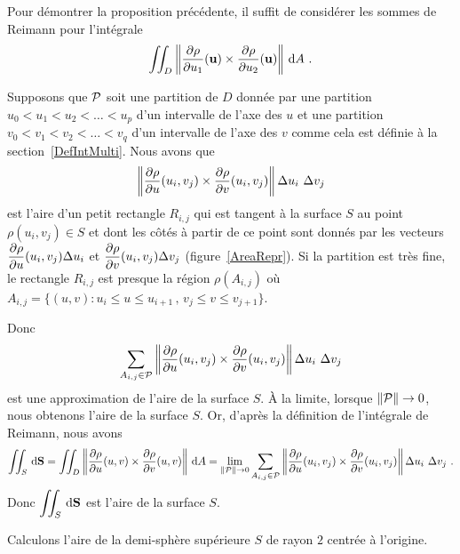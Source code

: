 {\begin{rmk}[\theory]
Pour démontrer la proposition précédente, il suffit de considérer les
sommes de Reimann pour l'intégrale
\[
\iint_D \left\|\frac{\partial \rho}{\partial u_1}(\mathbf{u}) \times
\frac{\partial \rho}{\partial u_2}(\mathbf{u})\right\| \,\mathrm{d}A \ .
\]

Supposons que $\cal P$ soit une partition de $D$ donnée par une partition
$u_0 < u_1 < u_2 < \ldots < u_p$ d'un intervalle de l'axe des $u$ et
une partition $v_0 < v_1 < v_2 < \ldots < v_{q}$ d'un intervalle de
l'axe des $v$ comme cela est définie à la section~\ref{DefIntMulti}.
Nous avons que
\[
\left\| \frac{\partial \rho}{\partial u}(u_i,v_j) \times \frac{\partial \rho}{\partial v}(u_i,v_j) \right\|
\Delta u_i \ \Delta v_j
\]
est l'aire d'un petit rectangle $R_{i,j}$ qui est tangent
à la surface $S$ au point $\rho(u_i,v_j) \in S$ et dont les côtés à
partir de ce point sont donnés par les vecteurs
$\displaystyle \frac{\partial \rho}{\partial u}(u_i,v_j) \Delta u_i$ et
$\displaystyle \frac{\partial \rho}{\partial v}(u_i,v_j) \Delta v_j$
(figure~\ref{AreaRepr}).  Si
la partition est très fine, le rectangle $R_{i,j}$ est presque la région
$\rho(A_{i,j})$ où
$A_{i,j} = \{(u,v) : u_i \leq u \leq u_{i+1}\, , \, v_j\leq v \leq v_{j+1}\}$.

Donc
\[
\sum_{A_{i,j}\in\cal P}
\left\| \frac{\partial \rho}{\partial u}(u_i,v_j) \times \frac{\partial \rho}{\partial v}(u_i,v_j) \right\|
\Delta u_i \ \Delta v_j
\]
est une approximation de l'aire de la surface $S$.  À la limite,
lorsque $\|{\cal P}\| \to 0$, nous obtenons l'aire de la surface $S$.
Or, d'après la définition de l'intégrale de Reimann, nous avons
\[
\iint_S \,\mathrm{d}\mathbf{S}
= \iint_D \left\|\frac{\partial \rho}{\partial u}(u,v)
\times \frac{\partial \rho}{\partial v}(u,v)\right\| \,\mathrm{d}A
=
\lim_{\|{\cal P}\|\to 0} \sum_{A_{i,j}\in\cal P}
\left\| \frac{\partial \rho}{\partial u}(u_i,v_j) \times \frac{\partial \rho}{\partial v}(u_i,v_j) \right\|
\Delta u_i \ \Delta v_j \ .
\]
Donc $\displaystyle \iint_S \,\mathrm{d}\mathbf{S}$ est l'aire de la surface $S$.
\label{AreaReprRMK}
\end{rmk}


\begin{egg}
Calculons l'aire de la demi-sphère supérieure $S$ de rayon
$2$ centrée à l'origine.


\end{egg}}

